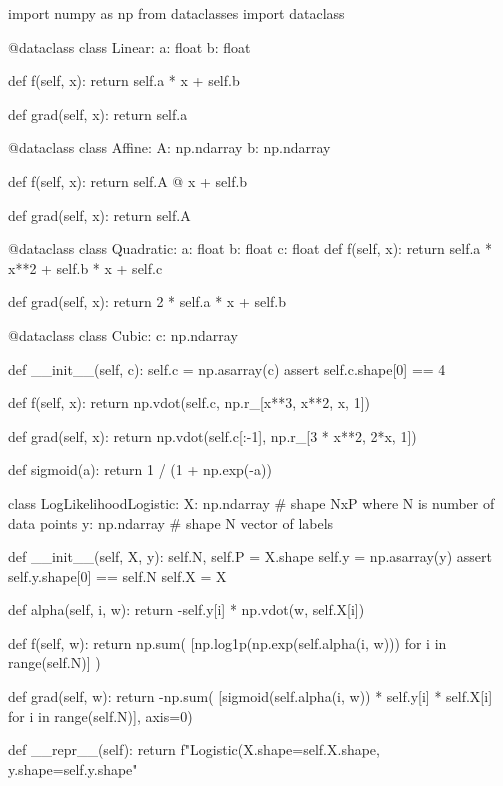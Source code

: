 \documentclass{homework}
\begin{document}
\begin{center}
\begin{python}
import numpy as np
from dataclasses import dataclass


@dataclass
class Linear:
    a: float
    b: float

    def f(self, x):
        return self.a * x + self.b

    def grad(self, x):
        return self.a

@dataclass
class Affine:
    A: np.ndarray
    b: np.ndarray
    
    def f(self, x):
        return self.A @ x + self.b
        
    def grad(self, x):
        return self.A

@dataclass
class Quadratic:
    a: float
    b: float
    c: float 
    def f(self, x):
        return self.a * x**2 + self.b * x + self.c

    def grad(self, x):
        return 2 * self.a * x + self.b

@dataclass
class Cubic:
    c: np.ndarray
    
    def __init__(self, c):
        self.c = np.asarray(c)
        assert self.c.shape[0] == 4
        
    def f(self, x):
        return np.vdot(self.c, np.r_[x**3, x**2, x, 1])

    def grad(self, x):
        return np.vdot(self.c[:-1], np.r_[3 * x**2, 2*x, 1])


def sigmoid(a):
    return 1 / (1 + np.exp(-a))
    
class LogLikelihoodLogistic:
    X: np.ndarray  # shape NxP where N is number of data points
    y: np.ndarray # shape N vector of labels

    def __init__(self, X, y):
        self.N, self.P = X.shape
        self.y = np.asarray(y)
        assert self.y.shape[0] == self.N
        self.X = X

    def alpha(self, i, w):
        return -self.y[i] * np.vdot(w, self.X[i])
        
    def f(self, w):
        return np.sum(
            [np.log1p(np.exp(self.alpha(i, w)))
             for i in range(self.N)]
        )

    def grad(self, w):
        return -np.sum(
            [sigmoid(self.alpha(i, w)) * self.y[i] * self.X[i]
             for i in range(self.N)], axis=0)

    def __repr__(self):
        return f"Logistic(X.shape={self.X.shape}, y.shape={self.y.shape}"
\end{python}
    \label{fig:python2}
\end{center}
\end{document}
